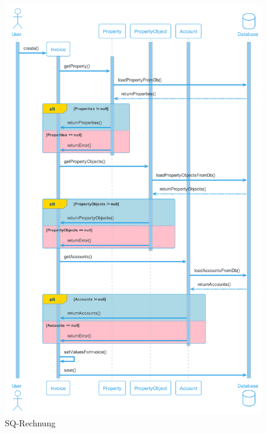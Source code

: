 \begin{figure}[H]
  \begin{center}
    \includegraphics[height=1\textheight]{content/diagrams/out/sequenzdiagram/rechnung/Rechnung.png}
    \caption{SQ-Rechnung}
    \label{sqREchnung}
  \end{center}
\end{figure}